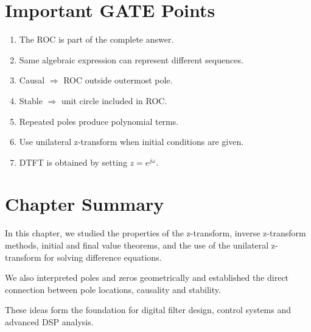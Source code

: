 \section{Important GATE Points}

\begin{enumerate}
\item The ROC is part of the complete answer.
\item Same algebraic expression can represent different sequences.
\item Causal \(\Rightarrow\) ROC outside outermost pole.
\item Stable \(\Rightarrow\) unit circle included in ROC.
\item Repeated poles produce polynomial terms.
\item Use unilateral z-transform when initial conditions are given.
\item DTFT is obtained by setting \(z=e^{j\omega}\).
\end{enumerate}


\section{Chapter Summary}

In this chapter, we studied the properties of the z-transform, inverse z-transform
methods, initial and final value theorems, and the use of the unilateral
z-transform for solving difference equations.

We also interpreted poles and zeros geometrically and established the direct
connection between pole locations, causality and stability.

These ideas form the foundation for digital filter design, control systems and
advanced DSP analysis.


